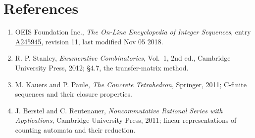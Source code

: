 \documentclass[11pt]{article}
\theoremstyle{definition}
\begin{document}
\section{References}

\begin{enumerate}

\item OEIS Foundation Inc., \emph{The On-Line Encyclopedia of Integer Sequences}, entry \href{https://oeis.org/A245945}{A245945}, revision 11, last modified Nov 05 2018.

\item R. P. Stanley, \emph{Enumerative Combinatorics}, Vol.~1, 2nd ed., Cambridge University Press, 2012; \S4.7, the transfer-matrix method.

\item M. Kauers and P. Paule, \emph{The Concrete Tetrahedron}, Springer, 2011; C-finite sequences and their closure properties.

\item J. Berstel and C. Reutenauer, \emph{Noncommutative Rational Series with Applications}, Cambridge University Press, 2011; linear representations of counting automata and their reduction.

\end{enumerate}
\end{document}
